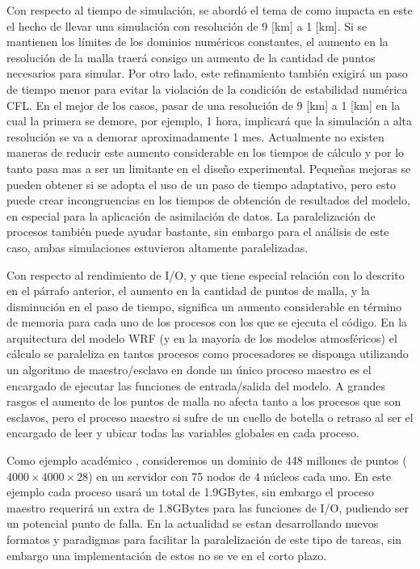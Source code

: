 Con respecto al tiempo de simulación, se abordó el tema de como impacta en este el hecho de llevar una simulación con resolución de 9 [km] a 1 [km]. Si se mantienen los límites de los dominios numéricos constantes, el aumento en la resolución de la malla traerá consigo un aumento de la cantidad de puntos necesarios para simular. Por otro lado, este refinamiento también exigirá un paso de tiempo menor para evitar la violación de la condición de estabilidad numérica CFL. En el mejor de los casos, pasar de una resolución de 9 [km] a 1 [km] en la cual la primera se demore, por ejemplo, 1 hora, implicará que la simulación a alta resolución se va a demorar aproximadamente 1 mes. Actualmente no existen maneras de reducir este aumento considerable en los tiempos de cálculo y por lo tanto pasa mas a ser un limitante en el diseño experimental. Pequeñas mejoras se pueden obtener si se adopta el uso de un paso de tiempo adaptativo, pero esto puede crear incongruencias en los tiempos de obtención de resultados del modelo, en especial para la aplicación de asimilación de datos. La paralelización de procesos también puede ayudar bastante, sin embargo para el análisis de este caso, ambas simulaciones estuvieron altamente paralelizadas.

Con respecto al rendimiento de I/O, y que tiene especial relación con lo descrito en el párrafo anterior, el aumento en la cantidad de puntos de malla, y la disminución en el paso de tiempo, significa un aumento considerable en término de memoria para cada uno de los procesos con los que se ejecuta el código. En la arquitectura del modelo WRF (y en la mayoría de los modelos atmosféricos) el cálculo se paraleliza en tantos procesos como procesadores se disponga utilizando un algoritmo de maestro/esclavo en donde un único proceso maestro es el encargado de ejecutar las funciones de entrada/salida del modelo. A grandes rasgos el aumento de los puntos de malla no afecta tanto a los procesos que son esclavos, pero el proceso maestro si sufre de un cuello de botella o retraso al ser el encargado de leer y ubicar todas las variables globales en cada proceso. 

Como ejemplo académico \citep{arnold2012high}, consideremos un dominio de 448 millones de puntos ($4000\times4000\times28$) en un servidor con 75 nodos de 4 núcleos cada uno. En este ejemplo cada proceso usará un total de 1.9GBytes, sin embargo el proceso maestro requerirá un extra de 1.8GBytes para las funciones de I/O, pudiendo ser un potencial punto de falla. En la actualidad se estan desarrollando nuevos formatos y paradigmas para facilitar la paralelización de este tipo de tareas, sin embargo una implementación de estos no se ve en el corto plazo.

